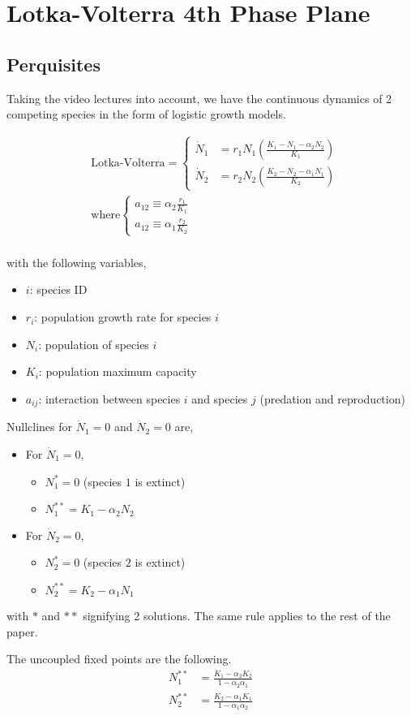 \section{Lotka-Volterra 4th Phase Plane}
\subsection{Perquisites}
Taking the video lectures into account, we have the continuous dynamics of 2 competing species in the form of logistic growth models.

\begin{equation}
  \begin{split}
    &\text{Lotka-Volterra} =
    \begin{cases}
      \dot N_1 &= r_1 N_1 \left( \frac {K_1 - N_1 - \alpha_2 N_2} {K_1} \right) \\
      \dot N_2 &= r_2 N_2 \left( \frac {K_2 - N_2 - \alpha_1 N_1} {K_2} \right)
    \end{cases} \\
    &\text{where}
    \begin{cases}
      a_{12} \equiv \alpha_2 \frac {r_1} {K_1} \\
      a_{12} \equiv \alpha_1 \frac {r_2} {K_2}
    \end{cases} \\
  \end{split}
\end{equation}

with the following variables,

\begin{itemize}
  \item $i$: species ID
  \item $r_i$: population growth rate for species $i$
  \item $N_i$: population of species $i$
  \item $K_i$: population maximum capacity
  \item $a_{ij}$: interaction between species $i$ and species $j$
  (predation and reproduction)
\end{itemize}

Nullclines for $\dot N_1 = 0$ and $\dot N_2 = 0$ are,
\begin{itemize}
  \label{ls:nullclines}
  \item [] For $\dot N_1 = 0$,
  \begin{itemize}
    \item $N_1^* = 0$ (species $1$ is extinct)
    \item $N_1^{**} = K_1 - \alpha_2 N_2$
  \end{itemize}
  \item [] For $\dot N_2 = 0$,
  \begin{itemize}
    \item $N_2^* = 0$ (species $2$ is extinct)
    \item $N_2^{**} = K_2 - \alpha_1 N_1$
  \end{itemize}
\end{itemize}

with $*$ and $**$ signifying 2 solutions. The same rule applies to the rest of the paper.

The uncoupled fixed points are the following.
\begin{align}
  N_1^{**} &= \frac {K_1 - \alpha_2 K_2} {1-\alpha_2 \alpha_1} \\
  N_2^{**} &= \frac {K_2 - \alpha_1 K_1} {1-\alpha_1 \alpha_2}
\end{align}
